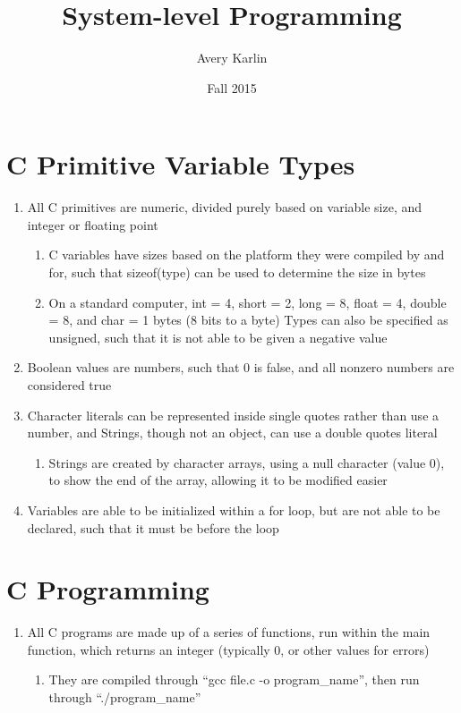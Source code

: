 \documentclass[11 pt, twoside]{article}
\begin{document}
\title{System-level Programming}
\author{Avery Karlin}
\date{Fall 2015}

\maketitle
\newpage
\tableofcontents
\newpage

\section{C Primitive Variable Types}
\begin{enumerate}
\item All C primitives are numeric, divided purely based on variable size, and integer or floating point
\begin{enumerate}
\item C variables have sizes based on the platform they were compiled by and for, such that sizeof(type) can be used to determine the size in bytes
\item On a standard computer, int = 4, short = 2, long = 8, float = 4, double = 8, and char = 1 bytes (8 bits to a byte)
\items Types can also be specified as unsigned, such that it is not able to be given a negative value
\end{enumerate}
\item Boolean values are numbers, such that 0 is false, and all nonzero numbers are considered true
\item Character literals can be represented inside single quotes rather than use a number, and Strings, though not an object, can use a double quotes literal
\begin{enumerate}
\item Strings are created by character arrays, using a null character (value 0), to show the end of the array, allowing it to be modified easier
\end{enumerate}
\item Variables are able to be initialized within a for loop, but are not able to be declared, such that it must be before the loop
\end{enumerate}

\section{C Programming}
\begin{enumerate}
\item All C programs are made up of a series of functions, run within the main function, which returns an integer (typically 0, or other values for errors)
\begin{enumerate}
\item They are compiled through “gcc file.c -o program_name”, then run through “./program_name”
\end{enumerate}
\end{enumerate}
\end{document}

